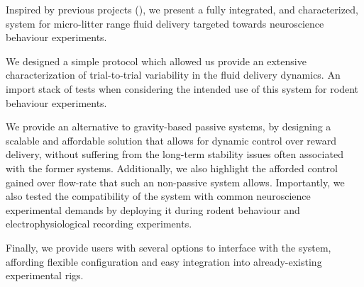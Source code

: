 Inspired by previous projects (\citep{Amarante2019, Wijnen2014}), we present a fully integrated, and characterized, system for micro-litter range fluid delivery targeted towards neuroscience behaviour experiments. 
 
We designed a simple protocol which allowed us provide an extensive characterization of trial-to-trial variability in the fluid delivery dynamics. An import stack of tests when considering the intended use of this system for rodent behaviour experiments.

We provide an alternative to gravity-based passive systems, by designing a scalable and affordable solution that allows for dynamic control over reward delivery, without suffering from the long-term stability issues often associated with the former systems. Additionally, we also highlight the afforded control gained over flow-rate that such an non-passive system allows.
Importantly, we also tested the compatibility of the system with common neuroscience experimental demands by deploying it during rodent behaviour and electrophysiological recording experiments.

Finally, we provide users with several options to interface with the system, affording flexible configuration and easy integration into already-existing experimental rigs. 